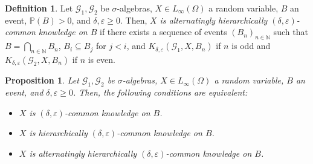 \documentclass[a4paper, 10pt]{article}
\numberwithin{theorem}{section}
\newtheorem{prop}[theorem]{Proposition}
\theoremstyle{definition}
\newtheorem{definition}[theorem]{Definition}
\newcommand{\N}{\mathbb{N}}
\newcommand{\G}{\mathcal{G}}
\renewcommand{\epsilon}{\varepsilon}
\renewcommand{\P}{\mathbb{P}}
\begin{document}
\begin{definition}
	Let $\G_1,\G_2$ be $\sigma$-algebras, $X \in L_\infty(\Omega)$ a random variable, $B$ an event, $\P(B)>0$, and $\delta,\epsilon \geq 0$. Then,  \emph{$X$ is alternatingly hierarchically $(\delta,\epsilon)$-common knowledge on $B$} if there exists a sequence of events $(B_n)_{n\in \N}$ such that $B=\bigcap_{n\in \N} B_n$,  $B_i \subseteq B_j$ for $j < i$, and $K_{\delta,\epsilon}(\G_1, X,B_n)$ if $n$ is odd and  $K_{\delta,\epsilon}(\G_2, X,B_n)$ if $n$ is even.
\end{definition}

\begin{prop}\label{prop:equivalences_of_near_common_knowledge_X}
	Let $\G_1,\G_2$ be $\sigma$-algebras, $X \in L_\infty(\Omega)$ a random variable, $B$ an event, and $\delta, \epsilon \geq 0$. Then, the following conditions are equivalent:
	\begin{itemize}
		\item [(1)]   $X$ is $(\delta, \epsilon)$-common knowledge on $B$. 
		\item [(2)]  $X$ is hierarchically $(\delta, \epsilon)$-common knowledge on $B$. 
		\item [(3)]  $X$ is alternatingly hierarchically $(\delta, \epsilon)$-common knowledge on $B$.
	\end{itemize}
\end{prop}
\end{document}
